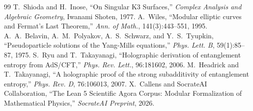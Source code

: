 \documentclass[11pt,a4paper]{article}
\begin{document}
\begin{thebibliography}{99}
 T.~Shioda and H.~Inose, ``On Singular K3 Surfaces,'' \textit{Complex Analysis and Algebraic Geometry}, Iwanami Shoten, 1977.
 A.~Wiles, ``Modular elliptic curves and Fermat's Last Theorem,'' \textit{Ann. of Math.}, 141(3):443--551, 1995.
 A.~A.~Belavin, A.~M.~Polyakov, A.~S.~Schwarz, and Y.~S.~Tyupkin, ``Pseudoparticle solutions of the Yang-Mills equations,'' \textit{Phys. Lett. B}, 59(1):85--87, 1975.
 S.~Ryu and T.~Takayanagi, ``Holographic derivation of entanglement entropy from AdS/CFT,'' \textit{Phys. Rev. Lett.}, 96:181602, 2006.
 M.~Headrick and T.~Takayanagi, ``A holographic proof of the strong subadditivity of entanglement entropy,'' \textit{Phys. Rev. D}, 76:106013, 2007.
 X.~Callens and SocrateAI Collaboration, ``The Lean 5 Scientific Agora Corpus: Modular Formalization of Mathematical Physics,'' \textit{SocrateAI Preprint}, 2026.
\end{thebibliography}
\end{document}
